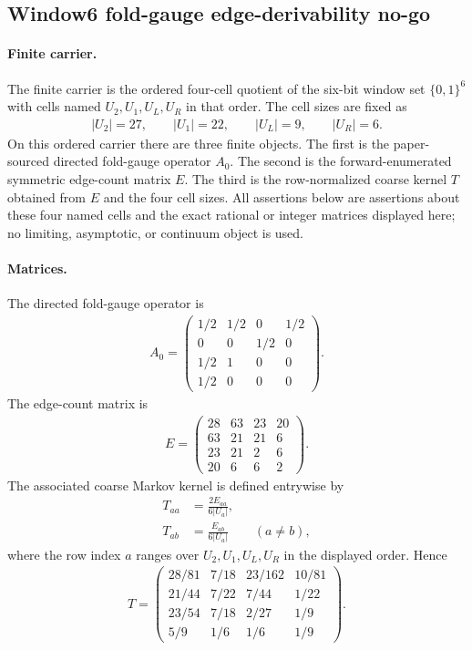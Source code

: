 \subsection{Window6 fold-gauge edge-derivability no-go}
\label{subsec:window6-fold-gauge-a0-edge-derivability-nogo}

\paragraph{Finite carrier.}
The finite carrier is the ordered four-cell quotient of the six-bit window set $\{0,1\}^6$ with cells named $U_2,U_1,U_L,U_R$ in that order.  The cell sizes are fixed as
$$
\begin{aligned}
|U_2|=27,\qquad |U_1|=22,\qquad |U_L|=9,\qquad |U_R|=6.
\end{aligned}
$$
On this ordered carrier there are three finite objects.  The first is the paper-sourced directed fold-gauge operator $A_0$.  The second is the forward-enumerated symmetric edge-count matrix $E$.  The third is the row-normalized coarse kernel $T$ obtained from $E$ and the four cell sizes.  All assertions below are assertions about these four named cells and the exact rational or integer matrices displayed here; no limiting, asymptotic, or continuum object is used.

\paragraph{Matrices.}
The directed fold-gauge operator is
$$
\begin{aligned}
A_0=
\begin{pmatrix}
1/2&1/2&0&1/2\\
0&0&1/2&0\\
1/2&1&0&0\\
1/2&0&0&0
\end{pmatrix}.
\end{aligned}
$$
The edge-count matrix is
$$
\begin{aligned}
E=
\begin{pmatrix}
28&63&23&20\\
63&21&21&6\\
23&21&2&6\\
20&6&6&2
\end{pmatrix}.
\end{aligned}
$$
The associated coarse Markov kernel is defined entrywise by
$$
\begin{aligned}
T_{aa}&=\frac{2E_{aa}}{6|U_a|},\\
T_{ab}&=\frac{E_{ab}}{6|U_a|}\qquad (a\ne b),
\end{aligned}
$$
where the row index $a$ ranges over $U_2,U_1,U_L,U_R$ in the displayed order.  Hence
$$
\begin{aligned}
T=
\begin{pmatrix}
28/81&7/18&23/162&10/81\\
21/44&7/22&7/44&1/22\\
23/54&7/18&2/27&1/9\\
5/9&1/6&1/6&1/9
\end{pmatrix}.
\end{aligned}
$$

